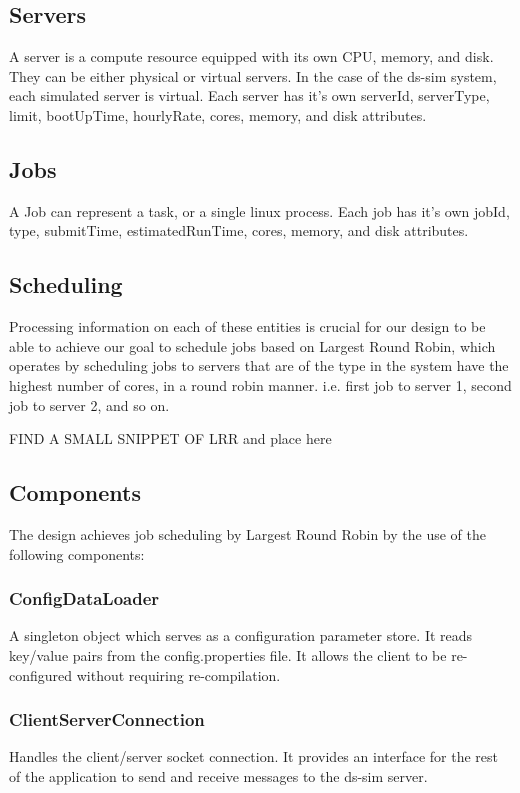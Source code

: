 \documentclass[a4paper]{article}
\begin{document}
\subsection{Servers}
A server is a compute resource equipped with its own CPU, memory, and disk. They can be either physical or virtual servers. In the case of the ds-sim system, each simulated server is virtual. Each server has it's own serverId, serverType, limit, bootUpTime, hourlyRate, cores, memory, and disk attributes.

\subsection{Jobs}
A Job can represent a task, or a single linux process. Each job has it's own jobId, type, submitTime, estimatedRunTime, cores, memory, and disk attributes.

\subsection{Scheduling}
Processing information on each of these entities is crucial for our design to be able to achieve our goal to schedule jobs based on Largest Round Robin, which operates by scheduling jobs to servers that are of the type in the system have the highest number of cores, in a round robin manner. i.e. first job to server 1, second job to server 2, and so on.

FIND A SMALL SNIPPET OF LRR and place here
\subsection{Components}
The design achieves job scheduling by Largest Round Robin by the use of the following components:

\subsubsection*{ConfigDataLoader}
A singleton object which serves as a configuration parameter store. It reads key/value pairs from the config.properties file. It allows the client to be re-configured without requiring re-compilation.

\subsubsection*{ClientServerConnection}
Handles the client/server socket connection. It provides an interface for the rest of the application to send and receive messages to the ds-sim server.
\end{document}

